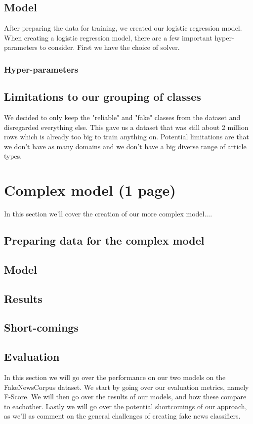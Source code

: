 \documentclass{article}
\begin{document}
\subsection{Model}
After preparing the data for training, we created our logistic regression model. When creating a logistic regression
model, there are a few important hyper-parameters to consider. First we have the choice of solver. 
\subsubsection{Hyper-parameters}


\subsection{Limitations to our grouping of classes}
We decided to only keep the "reliable" and "fake" classes from the dataset and disregarded everything else. This gave us a dataset that was still about 2 million rows which is already too big to train anything on. Potential limitations are that we don't have as many domains and we don't have a big diverse range of article types.


\section{Complex model (1 page)}\label{sec:complex_model}
In this section we'll cover the creation of our more complex model....
\subsection{Preparing data for the complex model}


\subsection{Model}

\subsection{Results}

\subsection{Short-comings}

\subsection{Evaluation}
In this section we will go over the performance on our two models on the FakeNewsCorpus dataset. We start by going over
our evaluation metrics, namely F-Score. We will then go over the results of our models, and how these compare to
eachother. Lastly we will go over the potential shortcomings of our approach, as we'll as comment on the general
challenges of creating fake news classifiers.
\end{document}
